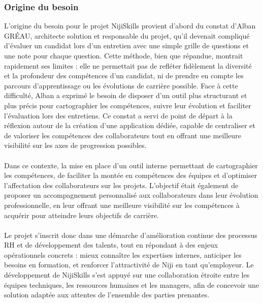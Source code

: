 \documentclass[12pt]{article}
\begin{document}
\subsubsection{Origine du besoin}
L'origine du besoin pour le projet NijiSkills provient d'abord du constat d'Alban GRÉAU, architecte solution et responsable du projet, qu'il devenait compliqué d'évaluer un candidat lors d'un entretien avec une simple grille de questions et une note pour chaque question. Cette méthode, bien que répandue, montrait rapidement ses limites : elle ne permettait pas de refléter fidèlement la diversité et la profondeur des compétences d'un candidat, ni de prendre en compte les parcours d'apprentissage ou les évolutions de carrière possible. Face à cette difficulté, Alban a exprimé le besoin de disposer d'un outil plus structurant et plus précis pour cartographier les compétences, suivre leur évolution et faciliter l'évaluation lors des entretiens. Ce constat a servi de point de départ à la réflexion autour de la création d'une application dédiée, capable de centraliser et de valoriser les compétences des collaborateurs tout en offrant une meilleure visibilité sur les axes de progression possibles.
\\\\
Dans ce contexte, la mise en place d’un outil interne permettant de cartographier les
compétences, de faciliter la montée en compétences des équipes et d’optimiser l’affectation
des collaborateurs sur les projets. L’objectif était également de proposer un accompagnement
personnalisé aux collaborateurs dans leur évolution professionnelle, en leur offrant une
meilleure visibilité sur les compétences à acquérir pour atteindre leurs objectifs de carrière.
\\\\
Le projet s’inscrit donc dans une démarche d’amélioration continue des processus RH
et de développement des talents, tout en répondant à des enjeux opérationnels concrets :
mieux connaître les expertises internes, anticiper les besoins en formation, et renforcer
l’attractivité de Niji en tant qu’employeur. Le développement de NijiSkills s’est appuyé
sur une collaboration étroite entre les équipes techniques, les ressources humaines et les
managers, afin de concevoir une solution adaptée aux attentes de l’ensemble des parties
prenantes.
\end{document}
